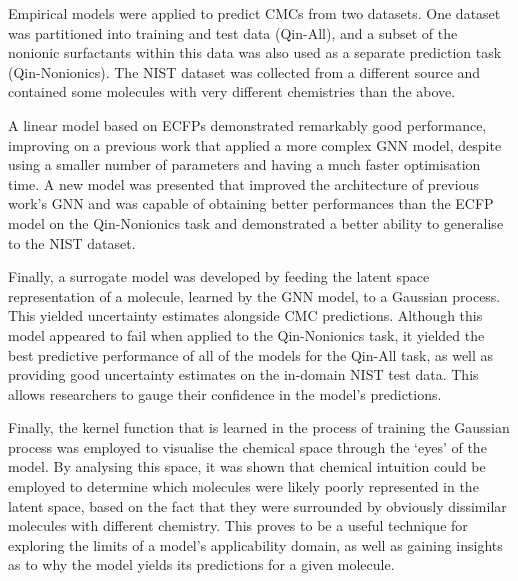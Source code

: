 Empirical models were applied to predict CMCs from two datasets. One dataset was partitioned into training and test data (Qin-All), and a subset of the nonionic surfactants within this data was also used as a separate prediction task
(Qin-Nonionics). The NIST dataset was collected from a different source and contained some molecules with very different chemistries than the above.

A linear model based on ECFPs demonstrated remarkably good performance, improving on a previous work \cite{qinPredictingCriticalMicelle2021} that applied a more complex GNN model, despite using a smaller number of parameters and having a much faster optimisation time. A new model was presented that improved the architecture of previous work's GNN and was capable of obtaining better performances than the ECFP model on the Qin-Nonionics task and
demonstrated a better ability to generalise to the NIST dataset.

Finally, a surrogate model was developed by feeding the latent space representation of a molecule, learned by the GNN model, to a Gaussian process.
This yielded uncertainty estimates alongside CMC predictions. Although this model appeared to fail when applied to the Qin-Nonionics task, it yielded the best predictive performance of all of the models for the Qin-All task, as well as
providing good uncertainty estimates on the in-domain NIST test data.
This allows researchers to gauge their confidence in the model's predictions.

Finally, the kernel function that is learned in the process of training the
Gaussian process was employed to visualise the chemical space through the `eyes'
of the model. By analysing this space, it was shown that chemical intuition
could be employed to determine which molecules were likely poorly represented in
the latent space, based on the fact that they were surrounded by obviously
dissimilar molecules with different chemistry. This proves to be a useful technique
for exploring the limits of a model's applicability domain, as well as gaining insights
as to why the model yields its predictions for a given molecule.